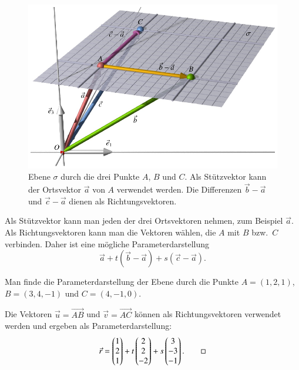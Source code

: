 \begin{figure}
\centering
\includegraphics{3/images/ebene3punkte.pdf}
\caption{Ebene $\sigma $ durch die drei Punkte $A$, $B$ und $C$.
Als Stützvektor kann der Ortsvektor $\vec{a}$ von $A$ verwendet werden.
Die Differenzen $\vec{b}-\vec{a}$ und $\vec{c}-\vec{a}$ dienen als
Richtungsvektoren.
\label{skript:affin:ebene3punkte}}
\end{figure}
Als Stützvektor kann man jeden der drei Ortsvektoren nehmen, zum Beispiel
$\vec{a}$.
Als Richtungsvektoren kann man die Vektoren wählen, die $A$ mit $B$ bzw.~$C$
verbinden.
Daher ist eine mögliche Parameterdarstellung
\[
\vec{a} + t (\vec{b}-\vec{a}) + s(\vec{c}-\vec{a}).
\]

\begin{beispiel}
Man finde die Parameterdarstellung der Ebene durch die Punkte
$A=(1,2,1)$,
$B=(3,4,-1)$ und
$C=(4,-1,0)$.

\smallskip

{\parindent 0pt Die} Vektoren $\vec u=\overrightarrow{AB}$ und
$\vec v=\overrightarrow{AC}$ können als Richtungsvektoren
verwendet werden und ergeben als Parameterdarstellung:
\begin{equation}
\vec r=\begin{pmatrix}1\\2\\1 \end{pmatrix}
+
t\begin{pmatrix}2\\2\\-2\end{pmatrix}
+
s\begin{pmatrix}3\\-3\\-1\end{pmatrix}.
\label{beispielebene}
\qedhere
\end{equation}
\end{beispiel}

